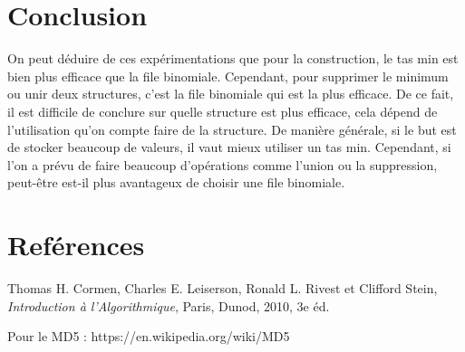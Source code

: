 \documentclass{article}
\begin{document}
\section{Conclusion}
On peut déduire de ces expérimentations que pour la construction, le tas min est bien plus efficace que la file binomiale. Cependant, pour supprimer le minimum ou unir deux structures, c’est la file binomiale qui est la plus efficace. De ce fait, il est difficile de conclure sur quelle structure est plus efficace, cela dépend de l’utilisation qu’on compte faire de la structure. De manière générale, si le but est de stocker beaucoup de valeurs, il vaut mieux utiliser un tas min. Cependant, si l’on a prévu de faire beaucoup d’opérations comme l’union ou la suppression, peut-être est-il plus avantageux de choisir une file binomiale.



\section{Reférences}

Thomas H. Cormen, Charles E. Leiserson, Ronald L. Rivest et Clifford Stein,\textit{ Introduction à l'Algorithmique}, Paris, Dunod, 2010, 3e éd.

Pour le MD5 : https://en.wikipedia.org/wiki/MD5
\end{document}
